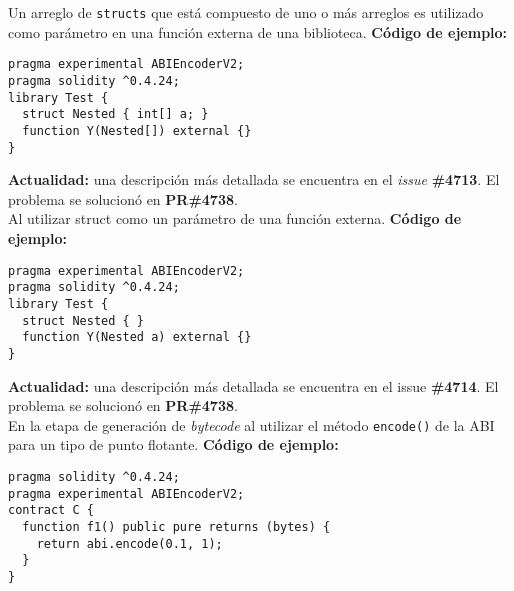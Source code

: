 Un arreglo de \texttt{structs} que está compuesto de uno o más arreglos es utilizado como parámetro en una función externa de una biblioteca. \textbf{Código de ejemplo:}
\begin{lstlisting}[language=Solidity]
pragma experimental ABIEncoderV2;                                                                                                              
pragma solidity ^0.4.24;                                                                                                                              
library Test {                                                                                                                                 
  struct Nested { int[] a; }                                                                                                                 
  function Y(Nested[]) external {}                                                                                                           
}
\end{lstlisting}

\textbf{Actualidad:} una descripción más detallada se encuentra en el \textit{issue} \textbf{\#4713}\cite{GHI4713}. El problema se solucionó en \textbf{PR\#4738}\cite{GHPR4738}.\\

Al utilizar struct como un parámetro de una función externa. \textbf{Código de ejemplo:}
\begin{lstlisting}[language=Solidity]
pragma experimental ABIEncoderV2;                                                                                                              
pragma solidity ^0.4.24;                                                                        
library Test {                                                                                                                                 
  struct Nested { }                                                                                                                          
  function Y(Nested a) external {}                                                                                                           
}
\end{lstlisting}

\textbf{Actualidad:} una descripción más detallada se encuentra en el issue \textbf{\#4714}\cite{GHI4714}. El problema se solucionó en \textbf{PR\#4738}\cite{GHPR4738}.\\

En la etapa de generación de \textit{bytecode} al utilizar el método \texttt{encode()} de la ABI para un tipo de punto flotante. \textbf{Código de ejemplo:}
\begin{lstlisting}[language=Solidity]
pragma solidity ^0.4.24;
pragma experimental ABIEncoderV2;
contract C {
  function f1() public pure returns (bytes) {
    return abi.encode(0.1, 1);
  }
}
\end{lstlisting}

